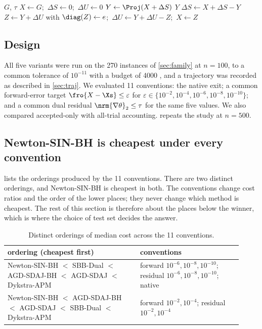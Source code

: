 \begin{algorithm}[t]
\caption{Dykstra-APM (alternating projections with Dykstra correction)}\label{alg:apm}
\begin{algorithmic}[1]
\Require $G$, $\tau$
\State $X\gets G$;\ $\Delta S\gets0$;\ $\Delta U\gets0$
\Loop
  \State $Y\gets\Proj(X+\Delta S)$ 
   \Return $Y$ 
  \EndIf
  \State $\Delta S\gets X+\Delta S-Y$
  \State $Z\gets Y+\Delta U$ with $\diag(Z)\gets e$;\ $\Delta U\gets Y+\Delta U-Z$;\ $X\gets Z$
\EndLoop
\end{algorithmic}
\end{algorithm}

\subsection{Design}
All five variants were run on the 270 instances of \cref{sec:family} at
$n=100$, to a common tolerance of $10^{-11}$ with a budget of 4000 \EVDs, and
a trajectory was recorded as described in \cref{sec:traj}. We evaluated 11
conventions: the native exit; a common forward-error target
$\fro{X-\Xs}\le\varepsilon$ for
$\varepsilon\in\{10^{-2},10^{-4},10^{-6},10^{-8},10^{-10}\}$; and a common
dual residual $\nrm{\nabla\theta}_2\le\tau$ for the same five values. We also
compared accepted-only with all-trial accounting.
 repeats the study at $n=500$.

\subsection{Newton-SIN-BH is cheapest under every convention}\label{sec:winner}
 lists the orderings produced by the 11 conventions.
There are two distinct orderings, and Newton-SIN-BH is cheapest in both. The
conventions change cost ratios and the order of the lower places; they never
change which method is cheapest. The rest of this section is therefore about
the places below the winner, which is where the choice of test set decides the
answer.

\begin{table}[t]
\centering
\caption{Distinct orderings of median cost across the 11 conventions.}
\label{tab:conventions}
\small
\begin{tabular}{p{0.52\linewidth}p{0.4\linewidth}}
\toprule
ordering (cheapest first) & conventions\\
\midrule
Newton-SIN-BH $<$ SBB-Dual $<$ AGD-SDAJ-BH $<$ AGD-SDAJ $<$ Dykstra-APM &
forward $10^{-6},10^{-8},10^{-10}$; residual $10^{-6},10^{-8},10^{-10}$; native\\
Newton-SIN-BH $<$ AGD-SDAJ-BH $<$ AGD-SDAJ $<$ SBB-Dual $<$ Dykstra-APM &
forward $10^{-2},10^{-4}$; residual $10^{-2},10^{-4}$\\
\bottomrule
\end{tabular}
\end{table}

